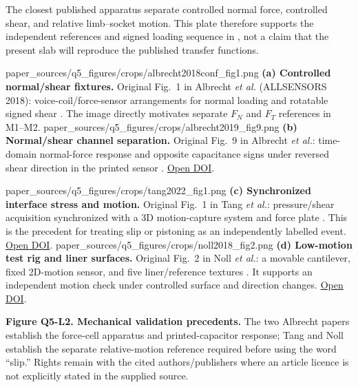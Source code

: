 \clearpage
\hypertarget{q5-lit-mechanical}{}

{\fontsize{8.75}{10.25}\selectfont
The closest published apparatus separate controlled normal force, controlled
shear, and relative limb--socket motion. This plate therefore supports the
independent references and signed loading sequence in
, not a claim that the present slab
will reproduce the published transfer functions.\par}

\vspace{0.55em}
\noindent
\qfivelitpanel{0.19\textheight}
  {paper_sources/q5_figures/crops/albrecht2018conf_fig1.png}
  {\textbf{(a) Controlled normal/shear fixtures.} Original Fig.~1 in Albrecht
  \textit{et al.} (ALLSENSORS 2018): voice-coil/force-sensor arrangements for
  normal loading and rotatable signed shear \cite{albrecht2018conf}. The image
  directly motivates separate $F_N$ and $F_T$ references in M1--M2.}
\hfill
\qfivelitpanel{0.19\textheight}
  {paper_sources/q5_figures/crops/albrecht2019_fig9.png}
  {\textbf{(b) Normal/shear channel separation.} Original Fig.~9 in
  Albrecht \textit{et al.}: time-domain normal-force response and opposite
  capacitance signs under reversed shear direction in the printed sensor
  \cite{albrecht2019}.
  \href{https://doi.org/10.1155/2019/1864239}{Open DOI}.}

\vspace{0.75em}
\noindent
\qfivelitpanel{0.205\textheight}
  {paper_sources/q5_figures/crops/tang2022_fig1.png}
  {\textbf{(c) Synchronized interface stress and motion.} Original Fig.~1 in
  Tang \textit{et al.}: pressure/shear acquisition synchronized with a 3D
  motion-capture system and force plate \cite{q3tang2022}. This is the
  precedent for treating slip or pistoning as an independently labelled event.
  \href{https://doi.org/10.1177/09544119221110712}{Open DOI}.}
\hfill
\qfivelitpanel{0.205\textheight}
  {paper_sources/q5_figures/crops/noll2018_fig2.png}
  {\textbf{(d) Low-motion test rig and liner surfaces.} Original Fig.~2 in
  Noll \textit{et al.}: a movable cantilever, fixed 2D-motion sensor, and five
  liner/reference textures \cite{noll2018}. It supports an independent motion
  check under controlled surface and direction changes.
  \href{https://doi.org/10.3390/s18072170}{Open DOI}.}

\vfill
{\fontsize{6.7}{7.7}\selectfont\color{AUBGray}
\textbf{Figure Q5-L2. Mechanical validation precedents.} The two Albrecht
papers establish the force-cell apparatus and printed-capacitor response;
Tang and Noll establish the separate relative-motion reference required before
using the word ``slip.'' Rights remain with the cited authors/publishers where
an article licence is not explicitly stated in the supplied source.\par}


